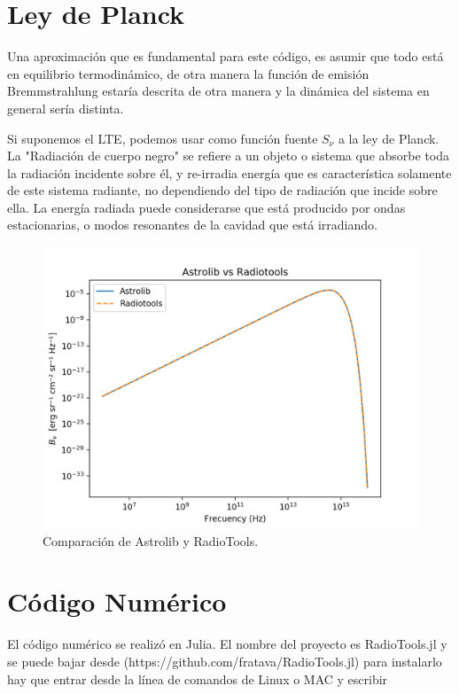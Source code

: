\documentclass[a4paper]{article}
\begin{document}
\section{Ley de Planck}

Una aproximación que es fundamental para este código, es asumir que todo está en equilibrio termodinámico, de otra manera la función de emisión Bremmstrahlung estaría descrita de otra manera y la dinámica del sistema en general sería distinta. 

Si suponemos el LTE, podemos usar como función fuente $S_\nu$ a la ley de Planck.
La "Radiación de cuerpo negro"  se refiere a un objeto o sistema que absorbe toda la radiación incidente sobre él, y re-irradia energía que es característica solamente de este sistema radiante, no dependiendo del tipo de radiación que incide sobre ella. La energía radiada puede considerarse que está producido por ondas estacionarias, o modos resonantes de la cavidad que está irradiando.

\begin{figure}[!htbp]
\begin{center}
\includegraphics[width=15cm]{asvsrt.png}
\end{center}
\caption{Comparación de Astrolib y RadioTools.}\label{planck}
\end{figure}

\newpage
\section{Código Numérico}

El código numérico se realizó en Julia. El nombre del proyecto es RadioTools.jl y se puede bajar desde (https://github.com/fratava/RadioTools.jl) para instalarlo hay que entrar desde la línea de comandos de Linux o MAC y escribir
\end{document}
